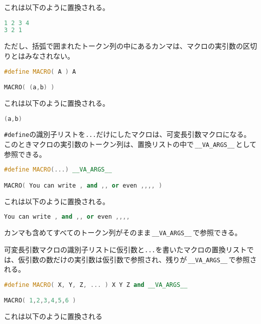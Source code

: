 これは以下のように置換される。

\begin{lstlisting}[language={C++}]
1 2 3 4
3 2 1
\end{lstlisting}

ただし、括弧で囲まれたトークン列の中にあるカンマは、マクロの実引数の区切りとはみなされない。

\begin{lstlisting}[language={C++}]
#define MACRO( A ) A

MACRO( (a,b) )
\end{lstlisting}

これは以下のように置換される。

\begin{lstlisting}[language={C++}]
(a,b)
\end{lstlisting}


\texttt{\#define}の識別子リストを\texttt{...}だけにしたマクロは、可変長引数マクロになる。このときマクロの実引数のトークン列は、置換リストの中で\,\texttt{\_\_VA\_ARGS\_\_}\,として参照できる。

\begin{lstlisting}[language={C++}]
#define MACRO(...) __VA_ARGS__

MACRO( You can write , and ,, or even ,,,, )
\end{lstlisting}

これは以下のように置換される。

\begin{lstlisting}[language={C++}]
You can write , and ,, or even ,,,,
\end{lstlisting}

カンマも含めてすべてのトークン列がそのまま\,\texttt{\_\_VA\_ARGS\_\_}\,で参照できる。

可変長引数マクロの識別子リストに仮引数と\texttt{...}を書いたマクロの置換リストでは、仮引数の数だけの実引数は仮引数で参照され、残りが\,\texttt{\_\_VA\_ARGS\_\_}\,で参照される。

\begin{lstlisting}[language={C++}]
#define MACRO( X, Y, Z, ... ) X Y Z and __VA_ARGS__

MACRO( 1,2,3,4,5,6 )
\end{lstlisting}

これは以下のように置換される

